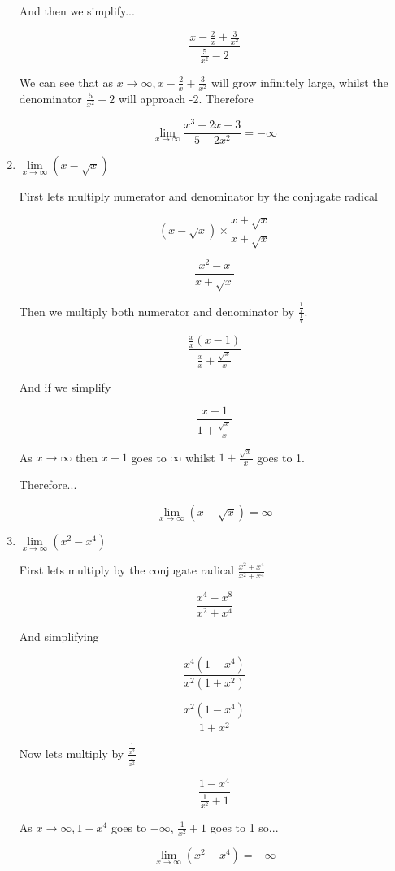 \documentclass{article}
\begin{document}
\begin{enumerate}
			And then we simplify...

			$$ \frac{ x - \frac{2}{x} + \frac{3}{x^2} }{ \frac{5}{x^2} - 2}$$

			We can see that as $x \to \infty, x - \frac{2}{x} + \frac{3}{x^2}$ will grow infinitely large, whilst
			the denominator $\frac{5}{x^2} - 2$ will approach -2. Therefore

			$$\lim \limits _{x \to \infty} \frac{x^3 - 2x + 3}{5 - 2x^2} = -\infty$$

		\item $\lim \limits _{x \to \infty} (x - \sqrt{x})$

			First lets multiply numerator and denominator by the conjugate radical

			$$(x - \sqrt{x}) \times \frac{x + \sqrt{x}}{x + \sqrt{x}}$$

			$$\frac{x^2 - x}{x + \sqrt{x}}$$

			Then we multiply both numerator and denominator by $\frac{ \frac{1}{x} }{ \frac{1}{x} }$.

			$$\frac{ \frac{x}{x} (x-1) }{ \frac{x}{x} + \frac{\sqrt{x}}{x}}$$

			And if we simplify

			$$\frac{x - 1}{1 + \frac{\sqrt{x}}{x}}$$

			As $x \to \infty$ then $x - 1$ goes to $\infty$ whilst $1 + \frac{\sqrt{x}}{x}$ goes to 1.

			Therefore...

			$$\lim \limits _{x \to \infty} (x - \sqrt{x}) = \infty$$

		\item $\lim \limits _{x \to \infty} (x^2 - x^4)$

			First lets multiply by the conjugate radical $\frac{x^2 + x^4}{x^2 + x^4}$

			$$\frac{x^4 - x^8}{x^2 + x^4}$$

			And simplifying

			$$\frac{x^4(1 - x^4)}{x^2(1 + x^2)}$$

			$$\frac{x^2(1 - x^4)}{1 + x^2}$$

			Now lets multiply by $\frac{ \frac{1}{x^2} }{ \frac{1}{x^2} }$

			$$\frac{1 - x^4}{ \frac{1}{x^2} + 1}$$

			As $x \to \infty, 1 - x^4$ goes to $-\infty$, $\frac{1}{x^2} + 1$ goes to 1 so...

			$$\lim \limits _{x \to \infty} (x^2 - x^4) = -\infty$$


\end{enumerate}
\end{document}
